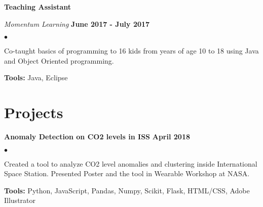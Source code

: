 \documentclass[margin,line]{res}
\newenvironment{list2}{
	\begin{list}{$\bullet$}{%
			\setlength{\itemsep}{0in}
			\setlength{\parsep}{0in} \setlength{\parskip}{0in}
			\setlength{\topsep}{0in} \setlength{\partopsep}{0in} 
			\setlength{\leftmargin}{0.2in}}}{\end{list}}
\begin{document}
\begin{resume}
		{\bf Teaching Assistant}
		
		\vspace{-.3cm}
		{\em Momentum Learning} \hfill {\bf June 2017 - July 2017}\\
		\begin{list2}
			\item Co-taught basics of programming to 16 kids from years of age 10 to 18 using Java and Object Oriented programming.
			\item \textbf{Tools:} Java, Eclipse
		\end{list2}
		\vspace*{.05in}
		
		
		
		
		
		
		\section{\sc Projects}
		
		{\bf Anomaly Detection on CO2 levels in ISS} \hfill {\bf April 2018}\\
		\vspace{-.3cm}
		\begin{list2}
			\item Created a tool to analyze CO2 level anomalies and clustering inside International Space Station. Presented Poster and the tool in Wearable Workshop at NASA.
			\item \textbf{Tools:} Python, JavaScript, Pandas, Numpy, Scikit, Flask, HTML/CSS, Adobe Illustrator
		\end{list2}
		

\end{resume}
\end{document}
